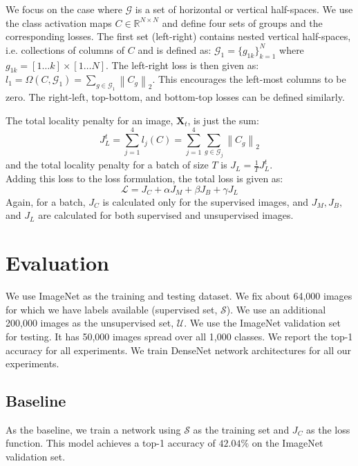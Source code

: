 \documentclass[runningheads]{llncs}
\begin{document}
We focus on the case where $\mathcal{G}$ is a set of horizontal or vertical half-spaces. We use the
class activation maps \cite{CAM} $C \in \mathbb{R}^{N \times N}$ and define four sets of groups
and the corresponding losses. The first set (left-right) contains nested vertical half-spaces, i.e.
collections of columns of $C$ and is defined as: $\mathcal{G}_1 = \{g_{1k}\}_{k=1}^{N}$ where $g_{1k} = [1 \dots
k] \times [1 \dots N]$. The left-right loss is then given as: $l_1 = \Omega (C, \mathcal{G}_1) = \sum_{g \in \mathcal{G}_1}
\left \lVert C_g \right \rVert _2$. This encourages the left-most columns to be zero. The right-left,
top-bottom, and bottom-top losses can be defined similarly.

The total locality penalty for an image, $\mathbf{X}_t$, is just the sum:
\begin{equation}
	J_L^t = \sum_{j=1}^{4}l_j(C) = \sum_{j=1}^4 \sum_{g \in \mathcal{G}_j} \left\lVert C_g
	\right\rVert_2
\end{equation}
and the total locality penalty for a batch of size $T$ is $J_L = \frac{1}{T} J_L^t$.\\

Adding this loss to the loss formulation, the total loss is given as:
\begin{equation}
	\mathcal{L} = J_C + \alpha J_M + \beta J_B + \gamma J_L
\end{equation}
Again, for a batch, $J_C$ is calculated only for the supervised images, and $J_M, J_B, $ and $J_L$
are calculated for both supervised and unsupervised images.


\section{Evaluation}
We use ImageNet as the training and testing dataset. We fix about 64,000 images for which
we have labels available (supervised set, $\mathcal{S}$). We use an additional 200,000 images as the
unsupervised set, $\mathcal{U}$. We use the ImageNet validation set for testing. It has 50,000
images spread over all 1,000 classes. We report the top-1 accuracy for all experiments. We train
DenseNet network architectures for all our experiments.

\subsection{Baseline}
As the baseline, we train a network using $\mathcal{S}$ as the training set and $J_C$ as the loss
function. This model achieves a top-1 accuracy of $42.04\%$ on the ImageNet validation set. 
\end{document}
